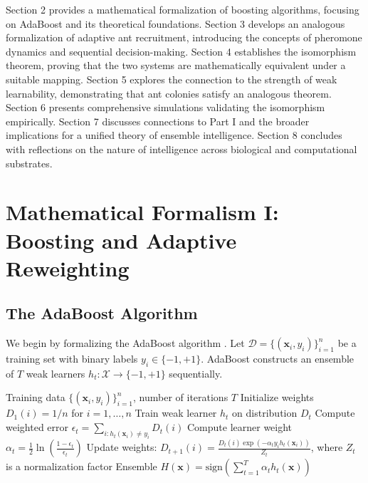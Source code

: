 \documentclass[12pt,letterpaper]{article}
\begin{document}
Section 2 provides a mathematical formalization of boosting algorithms, focusing on AdaBoost and its theoretical foundations. Section 3 develops an analogous formalization of adaptive ant recruitment, introducing the concepts of pheromone dynamics and sequential decision-making. Section 4 establishes the isomorphism theorem, proving that the two systems are mathematically equivalent under a suitable mapping. Section 5 explores the connection to the strength of weak learnability, demonstrating that ant colonies satisfy an analogous theorem. Section 6 presents comprehensive simulations validating the isomorphism empirically. Section 7 discusses connections to Part I and the broader implications for a unified theory of ensemble intelligence. Section 8 concludes with reflections on the nature of intelligence across biological and computational substrates.

\section{Mathematical Formalism I: Boosting and Adaptive Reweighting}

\subsection{The AdaBoost Algorithm}

We begin by formalizing the AdaBoost algorithm \citep{freund1997decision}. Let $\mathcal{D} = \{(\mathbf{x}_i, y_i)\}_{i=1}^n$ be a training set with binary labels $y_i \in \{-1, +1\}$. AdaBoost constructs an ensemble of $T$ weak learners $h_t: \mathcal{X} \to \{-1, +1\}$ sequentially.

\begin{algorithm}[H]
\caption{AdaBoost}
\label{alg:adaboost}
\begin{algorithmic}[1]
\REQUIRE Training data $\{(\mathbf{x}_i, y_i)\}_{i=1}^n$, number of iterations $T$
\STATE Initialize weights $D_1(i) = 1/n$ for $i = 1,\dots,n$
    \STATE Train weak learner $h_t$ on distribution $D_t$
    \STATE Compute weighted error $\epsilon_t = \sum_{i: h_t(\mathbf{x}_i) \neq y_i} D_t(i)$
    \STATE Compute learner weight $\alpha_t = \frac{1}{2}\ln\left(\frac{1-\epsilon_t}{\epsilon_t}\right)$
    \STATE Update weights: $D_{t+1}(i) = \frac{D_t(i)\exp(-\alpha_t y_i h_t(\mathbf{x}_i))}{Z_t}$, where $Z_t$ is a normalization factor
\ENDFOR
\RETURN Ensemble $H(\mathbf{x}) = \text{sign}\left(\sum_{t=1}^T \alpha_t h_t(\mathbf{x})\right)$
\end{algorithmic}
\end{algorithm}
\end{document}

